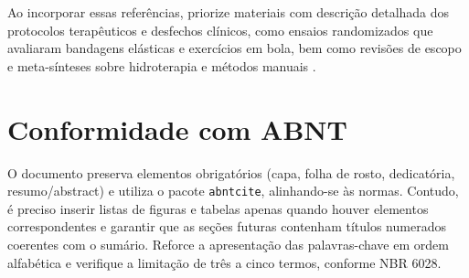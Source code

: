 \documentclass[12pt,oneside,a4paper]{article}
\begin{document}
Ao incorporar essas referências, priorize materiais com descrição detalhada dos protocolos terapêuticos e desfechos clínicos, como ensaios randomizados que avaliaram bandagens elásticas e exercícios em bola, bem como revisões de escopo e meta-sínteses sobre hidroterapia e métodos manuais \cite{miquelutti2018,aslantas2023,melladogarcia2024,smith2018}.

\section*{Conformidade com ABNT}
O documento preserva elementos obrigatórios (capa, folha de rosto, dedicatória, resumo/abstract) e utiliza o pacote \texttt{abntcite}, alinhando-se às normas. Contudo, é preciso inserir listas de figuras e tabelas apenas quando houver elementos correspondentes e garantir que as seções futuras contenham títulos numerados coerentes com o sumário. Reforce a apresentação das palavras-chave em ordem alfabética e verifique a limitação de três a cinco termos, conforme NBR 6028.



\end{document}
